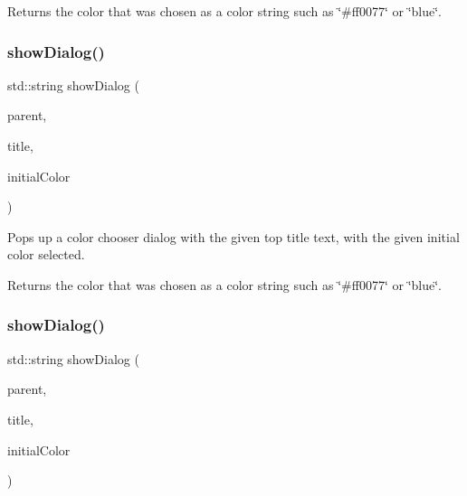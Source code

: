 Returns the color that was chosen as a color string such as \char`\"{}\#ff0077\char`\"{} or \char`\"{}blue\char`\"{}. \mbox{\label{classsgl_1_1GColorChooser_a2c513cab2b8e569b35327f89117b077f}} 
\subsubsection{\texorpdfstring{show\+Dialog()}{showDialog()}\hspace{0.1cm}{\footnotesize\ttfamily [2/6]}}
{\footnotesize\ttfamily std\+::string show\+Dialog (\begin{DoxyParamCaption}\item[{\mbox{\hyperlink{classsgl_1_1GWindow}{G\+Window}} $\ast$}]{parent,  }\item[{const std\+::string \&}]{title,  }\item[{int}]{initial\+Color }\end{DoxyParamCaption})\hspace{0.3cm}{\ttfamily [static]}}



Pops up a color chooser dialog with the given top title text, with the given initial color selected. 

Returns the color that was chosen as a color string such as \char`\"{}\#ff0077\char`\"{} or \char`\"{}blue\char`\"{}. \mbox{\label{classsgl_1_1GColorChooser_a8bac6bfe2b583f676c2ede745053fff6}} 
\subsubsection{\texorpdfstring{show\+Dialog()}{showDialog()}\hspace{0.1cm}{\footnotesize\ttfamily [3/6]}}
{\footnotesize\ttfamily std\+::string show\+Dialog (\begin{DoxyParamCaption}\item[{Q\+Widget $\ast$}]{parent,  }\item[{const std\+::string \&}]{title,  }\item[{int}]{initial\+Color }\end{DoxyParamCaption})\hspace{0.3cm}{\ttfamily [static]}}



